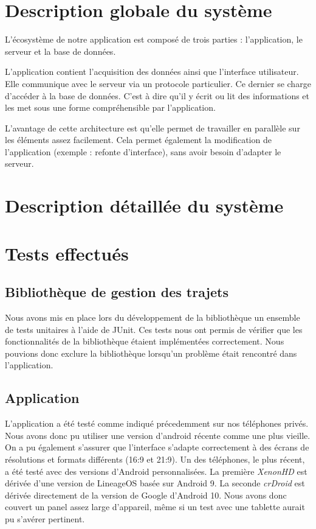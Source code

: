 \section{Description globale du système}

L'écosystème de notre application est composé de trois parties : l'application, le serveur et la base de données.
\par
L'application contient l'acquisition des données ainsi que l'interface utilisateur. Elle communique avec le serveur via un protocole particulier.
Ce dernier se charge d'accéder à la base de données. C'est à dire qu'il y écrit ou lit des informations et les met sous une forme compréhensible par l'application.
\par
L'avantage de cette architecture est qu'elle permet de travailler en parallèle sur les éléments assez facilement. Cela permet également la modification de l'application (exemple : refonte d'interface), sans avoir besoin d'adapter le serveur.
\section{Description détaillée du système}



\section{Tests effectués}
\subsection{Bibliothèque de gestion des trajets}
Nous avons mis en place lors du développement de la bibliothèque un ensemble de tests unitaires à l'aide de JUnit.
Ces tests nous ont permis de vérifier que les fonctionnalités de la bibliothèque étaient implémentées correctement.
Nous pouvions donc exclure la bibliothèque lorsqu'un problème était rencontré dans l'application.
\subsection{Application}
L'application a été testé comme indiqué précedemment sur nos téléphones privés. Nous avons donc pu utiliser une version d'android récente comme une plus vieille. On a pu également s'assurer que l'interface s'adapte correctement à des écrans de résolutions et formats différents (16:9 et 21:9).
Un des téléphones, le plus récent, a été testé avec des versions d'Android personnalisées. La première \emph{XenonHD} est dérivée d'une version de LineageOS basée sur Android 9. La seconde \emph{crDroid} est dérivée directement de la version de Google d'Android 10. Nous avons donc couvert un panel assez large d'appareil, même si un test avec une tablette aurait pu s'avérer pertinent.